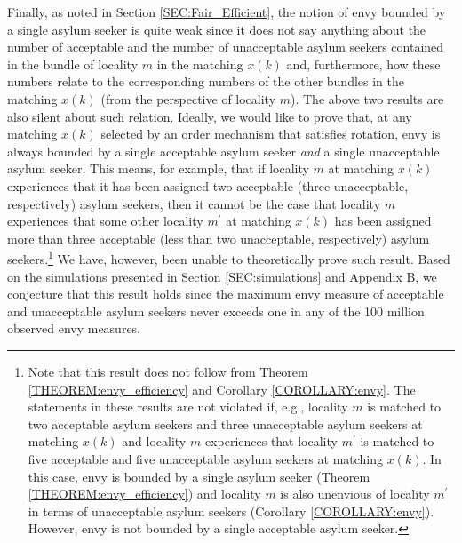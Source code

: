 \documentclass[12pt,fleqn]{article}
\newtheorem{theorem}{Theorem}
\begin{document}
\noindent Finally, as noted in Section \ref{SEC:Fair_Efficient}, the notion of envy bounded by a single asylum seeker is quite weak since it does not say anything about the number of acceptable and the number of unacceptable asylum seekers contained in the bundle of locality $m$ in the matching $x(k)$ and, furthermore, how these numbers relate to the corresponding numbers of the other bundles in the matching $x(k)$ (from the perspective of locality $m$). The above two results are also silent about such relation. Ideally, we would like to prove that, at any matching $x(k)$ selected by an order mechanism that satisfies rotation, envy is always bounded by a single acceptable asylum seeker \emph{and} a single unacceptable asylum seeker. This means, for example, that if locality $m$ at matching $x(k)$ experiences that it has been assigned two acceptable (three unacceptable, respectively) asylum seekers, then it cannot be the case that locality $m$ experiences that some other locality $m^\prime$ at matching $x(k)$ has been assigned more than three acceptable (less than two unacceptable, respectively) asylum seekers.\footnote{Note that this result does not follow from Theorem \ref{THEOREM:envy_efficiency} and Corollary \ref{COROLLARY:envy}. The statements in these results are not violated if, e.g., locality $m$ is matched to two acceptable asylum seekers and three unacceptable asylum seekers at matching $x(k)$ and locality $m$ experiences that locality $m^\prime$ is matched to five acceptable and five unacceptable asylum seekers at matching $x(k)$. In this case, envy is bounded by a single asylum seeker (Theorem \ref{THEOREM:envy_efficiency}) and locality $m$ is also unenvious of locality $m^\prime$ in terms of unacceptable asylum seekers (Corollary \ref{COROLLARY:envy}). However, envy is not bounded by a single acceptable asylum seeker.} We have, however, been unable to theoretically prove such result. Based on the simulations presented in Section \ref{SEC:simulations} and Appendix B, we conjecture that this result holds since the maximum envy measure of acceptable and unacceptable asylum seekers never exceeds one in any of the 100 million observed envy measures.

\end{document}
